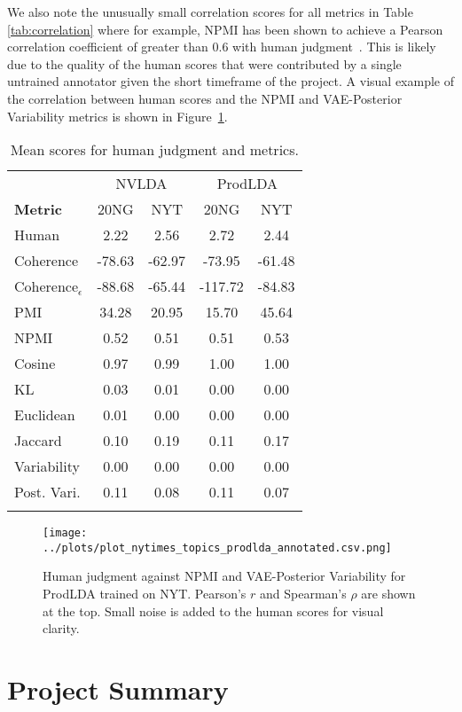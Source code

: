 \documentclass[10pt]{article}
\begin{document}
We also note the unusually small correlation scores for all metrics in Table \ref{tab:correlation} where for example, NPMI has been shown to achieve a Pearson correlation coefficient of greater than 0.6 with human judgment~\cite{Xing:2019}. This is likely due to the quality of the human scores that were contributed by a single untrained annotator given the short timeframe of the project. A visual example of the correlation between human scores and the NPMI and VAE-Posterior Variability metrics is shown in Figure~\ref{fig:correlation}.

\begin{table}[t]
\centering
\begin{tabular}{l|cccc}
\Xhline{4\arrayrulewidth}
& \multicolumn{2}{c}{NVLDA} & \multicolumn{2}{c}{ProdLDA} \\
\textbf{Metric} & 20NG & NYT & 20NG & NYT \\
\hline
Human & 2.22 & 2.56 & 2.72 & 2.44 \\
\hline
Coherence & -78.63 & -62.97 & -73.95 & -61.48 \\
Coherence$_\epsilon$ & -88.68 & -65.44 & -117.72 & -84.83 \\
PMI & 34.28 & 20.95 & 15.70 & 45.64 \\
NPMI & 0.52 & 0.51 & 0.51 & 0.53 \\
\hline
Cosine & 0.97 & 0.99 & 1.00 & 1.00 \\
KL & 0.03 & 0.01 & 0.00 & 0.00 \\
Euclidean & 0.01 & 0.00 & 0.00 & 0.00 \\
Jaccard & 0.10 & 0.19 & 0.11 & 0.17 \\
Variability & 0.00 & 0.00 & 0.00 & 0.00 \\
Post. Vari. & 0.11 & 0.08 & 0.11 & 0.07 \\
\Xhline{3\arrayrulewidth}
\end{tabular}
\caption{Mean scores for human judgment and metrics.}
\label{tab:scores}
\end{table}

\begin{figure}[t]
\centering
\texttt{[image: ../plots/plot\_nytimes\_topics\_prodlda\_annotated.csv.png]}
\caption{Human judgment against NPMI and VAE-Posterior Variability for ProdLDA trained on NYT. Pearson's $r$ and Spearman's $\rho$ are shown at the top. Small noise is added to the human scores for visual clarity.}
\label{fig:correlation}
\end{figure}

\section{Project Summary}
\end{document}
